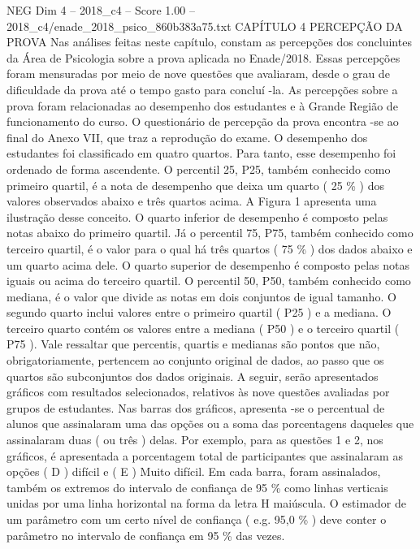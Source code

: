 \begin{textsample}{NEG Dim 4 – 2018\_c4 – Score 1.00 – 2018\_c4/enade\_2018\_psico\_860b383a75.txt}  \label{ex:f4_neg_172}
CAPÍTULO 4 PERCEPÇÃO DA PROVA Nas análises feitas neste capítulo, constam as percepções dos concluintes da Área de Psicologia sobre a prova aplicada no Enade/2018.
Essas percepções foram mensuradas por meio de nove questões que avaliaram, desde o grau de dificuldade da prova até o tempo gasto para concluí -la.
As percepções sobre a prova foram relacionadas ao desempenho dos estudantes e à Grande Região de funcionamento do curso.
O questionário de percepção da prova encontra -se ao final do Anexo VII, que traz a reprodução do exame.
O desempenho dos estudantes foi classificado em quatro quartos.
Para tanto, esse desempenho foi ordenado de forma ascendente.
O percentil 25, P25, também conhecido como primeiro quartil, é a nota de desempenho que deixa um quarto ( 25 \% ) dos valores observados abaixo e três quartos acima.
A Figura 1 apresenta uma ilustração desse conceito.
O quarto inferior de desempenho é composto pelas notas abaixo do primeiro quartil.
Já o percentil 75, P75, também conhecido como terceiro quartil, é o valor para o qual há três quartos ( 75 \% ) dos dados abaixo e um quarto acima dele.
O quarto superior de desempenho é composto pelas notas iguais ou acima do terceiro quartil.
O percentil 50, P50, também conhecido como mediana, é o valor que divide as notas em dois conjuntos de igual tamanho.
O segundo quarto inclui valores entre o primeiro quartil ( P25 ) e a mediana.
O terceiro quarto contém os valores entre a mediana ( P50 ) e o terceiro quartil ( P75 ).
Vale ressaltar que percentis, quartis e medianas são pontos que não, obrigatoriamente, pertencem ao conjunto original de dados, ao passo que os quartos são subconjuntos dos dados originais.
A seguir, serão apresentados gráficos com resultados selecionados, relativos às nove questões avaliadas por grupos de estudantes.
Nas barras dos gráficos, apresenta -se o percentual de alunos que assinalaram uma das opções ou a soma das porcentagens daqueles que assinalaram duas ( ou três ) delas.
Por exemplo, para as questões 1 e 2, nos gráficos, é apresentada a porcentagem total de participantes que assinalaram as opções ( D ) difícil e ( E ) Muito difícil.
Em cada barra, foram assinalados, também os extremos do intervalo de confiança de 95 \% como linhas verticais unidas por uma linha horizontal na forma da letra H maiúscula.
O estimador de um parâmetro com um certo nível de confiança ( e.g. 95,0 \% ) deve conter o parâmetro no intervalo de confiança em 95 \% das vezes.

\end{textsample}
